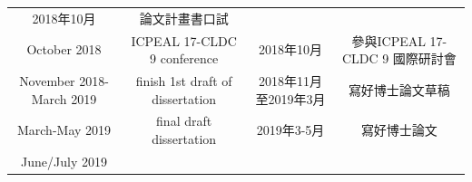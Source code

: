 \documentclass[12pt,]{article}
\theoremstyle{definition}
\theoremstyle{definition}
\theoremstyle{definition}
\theoremstyle{remark}
\begin{document}
\begin{longtable}[]{@{}cccc@{}}
\begin{minipage}[t]{0.18\columnwidth}
2018年10月\strut
\end{minipage} & \begin{minipage}[t]{0.24\columnwidth}\centering\strut
論文計畫書口試\strut
\end{minipage}\tabularnewline
\begin{minipage}[t]{0.20\columnwidth}\centering\strut
October 2018\strut
\end{minipage} & \begin{minipage}[t]{0.26\columnwidth}\centering\strut
ICPEAL 17-CLDC 9 conference\strut
\end{minipage} & \begin{minipage}[t]{0.18\columnwidth}\centering\strut
2018年10月\strut
\end{minipage} & \begin{minipage}[t]{0.24\columnwidth}\centering\strut
參與ICPEAL 17-CLDC 9 國際研討會\strut
\end{minipage}\tabularnewline
\begin{minipage}[t]{0.20\columnwidth}\centering\strut
November 2018- March 2019\strut
\end{minipage} & \begin{minipage}[t]{0.26\columnwidth}\centering\strut
finish 1st draft of dissertation\strut
\end{minipage} & \begin{minipage}[t]{0.18\columnwidth}\centering\strut
2018年11月 至2019年3月\strut
\end{minipage} & \begin{minipage}[t]{0.24\columnwidth}\centering\strut
寫好博士論文草稿\strut
\end{minipage}\tabularnewline
\begin{minipage}[t]{0.20\columnwidth}\centering\strut
March-May 2019\strut
\end{minipage} & \begin{minipage}[t]{0.26\columnwidth}\centering\strut
final draft dissertation\strut
\end{minipage} & \begin{minipage}[t]{0.18\columnwidth}\centering\strut
2019年3-5月\strut
\end{minipage} & \begin{minipage}[t]{0.24\columnwidth}\centering\strut
寫好博士論文\strut
\end{minipage}\tabularnewline
\begin{minipage}[t]{0.20\columnwidth}\centering\strut
June/July 2019\strut
\end{minipage} & \begin{minipage}[t]{0.26\columnwidth}\centering\strut

\end{minipage}
\end{longtable}
\end{document}
